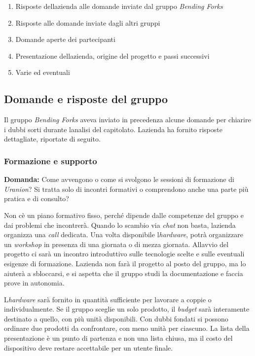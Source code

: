 \documentclass[12pt,a4paper]{article}
\newcommand{\tightlist}{\setlength{\itemsep}{1pt}\setlength{\parskip}{0pt}}
\begin{document}
\begin{enumerate}
\def\labelenumi{\arabic{enumi}.}
\tightlist
\item
  Risposte dell\textquotesingle azienda alle domande inviate dal gruppo \emph{Bending Forks}
\item
  Risposte alle domande inviate dagli altri gruppi
\item
  Domande aperte dei partecipanti
\item
  Presentazione dell\textquotesingle azienda, origine del progetto e passi successivi
\item
  Varie ed eventuali
\end{enumerate}

\hypertarget{domande-e-risposte-del-gruppo}{%
\subsection{Domande e risposte del gruppo}}

Il gruppo \emph{Bending Forks} aveva inviato in precedenza alcune domande per chiarire i dubbi sorti durante l\textquotesingle analisi del capitolato. L\textquotesingle azienda ha fornito risposte dettagliate, riportate di seguito.

\hypertarget{formazione-e-supporto}{%
\subsubsection{Formazione e supporto}}

\textbf{Domanda:} Come avvengono o come si svolgono le sessioni di formazione di \emph{Uranion}? Si tratta solo di incontri formativi o comprendono anche una parte più pratica e di consulto?

Non c\textquotesingle è un piano formativo fisso, perché dipende dalle competenze del gruppo e dai problemi che incontrerà. Quando lo scambio via \emph{chat} non basta, l\textquotesingle azienda organizza una \emph{call} dedicata. Una volta disponibile l\textquotesingle{}\emph{hardware}, potrà organizzare un \emph{workshop} in presenza di una giornata o di mezza giornata. All\textquotesingle avvio del progetto ci sarà un incontro introduttivo sulle tecnologie scelte e sulle eventuali esigenze di formazione. L\textquotesingle azienda non farà il progetto al posto del gruppo, ma lo aiuterà a sbloccarsi, e si aspetta che il gruppo studi la documentazione e faccia prove in autonomia.

L\textquotesingle{}\emph{hardware} sarà fornito in quantità sufficiente per lavorare a coppie o individualmente. Se il gruppo sceglie un solo prodotto, il \emph{budget} sarà interamente destinato a quello, con più unità disponibili. Con dubbi fondati si possono ordinare due prodotti da confrontare, con meno unità per ciascuno. La lista della presentazione è un punto di partenza e non una lista chiusa, ma il costo del dispositivo deve restare accettabile per un utente finale.
\end{document}
